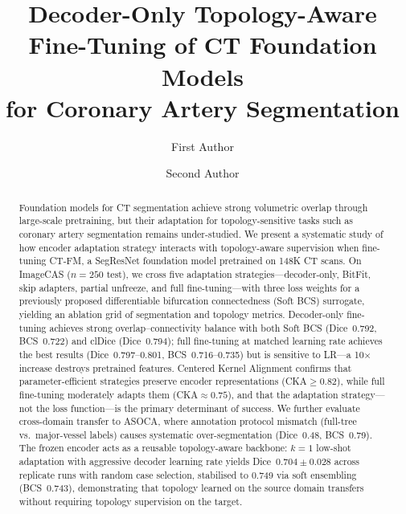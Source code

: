 \documentclass[runningheads]{llncs}
\begin{document}
\title{Decoder-Only Topology-Aware Fine-Tuning of CT Foundation Models\\for Coronary Artery Segmentation}

\author{First Author \and
Second Author}
%
%

\maketitle

\begin{abstract}
Foundation models for CT segmentation achieve strong volumetric overlap through large-scale pretraining, but their adaptation for topology-sensitive tasks such as coronary artery segmentation remains under-studied.
We present a systematic study of how encoder adaptation strategy interacts with topology-aware supervision when fine-tuning CT-FM, a SegResNet foundation model pretrained on 148K CT scans.
On ImageCAS ($n{=}250$ test), we cross five adaptation strategies---decoder-only, BitFit, skip adapters, partial unfreeze, and full fine-tuning---with three loss weights for a previously proposed differentiable bifurcation connectedness (Soft BCS) surrogate, yielding an ablation grid of segmentation and topology metrics.
Decoder-only fine-tuning achieves strong overlap--connectivity balance with both Soft BCS (Dice~0.792, BCS~0.722) and clDice (Dice~0.794); full fine-tuning at matched learning rate achieves the best results (Dice~0.797--0.801, BCS~0.716--0.735) but is sensitive to LR---a 10$\times$ increase destroys pretrained features.
Centered Kernel Alignment confirms that parameter-efficient strategies preserve encoder representations (CKA${\geq}0.82$), while full fine-tuning moderately adapts them (CKA${\approx}0.75$), and that the adaptation strategy---not the loss function---is the primary determinant of success.
We further evaluate cross-domain transfer to ASOCA, where annotation protocol mismatch (full-tree vs.\ major-vessel labels) causes systematic over-segmentation (Dice~0.48, BCS~0.79).
The frozen encoder acts as a reusable topology-aware backbone: $k{=}1$ low-shot adaptation with aggressive decoder learning rate yields Dice~$0.704{\pm}0.028$ across replicate runs with random case selection, stabilised to 0.749 via soft ensembling (BCS~0.743), demonstrating that topology learned on the source domain transfers without requiring topology supervision on the target.
\end{abstract}
\end{document}
